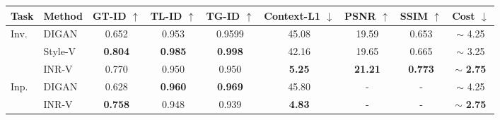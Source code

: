 \documentclass[10pt]{article} \usepackage[accepted]{tmlr}
\begin{document}
\begin{wraptable}[21]{R}{12cm}

\centering
\vspace{5pt}

\begin{adjustbox}{max width=\linewidth}
\begin{tabular}{l | l | cccccc| c}
\toprule  
Task & Method & GT-ID $\uparrow$ & TL-ID $\uparrow$ & TG-ID $\uparrow$ & Context-L1 $\downarrow$ & PSNR $\uparrow$ & SSIM $\uparrow$ & Cost $\downarrow$ \\ \midrule
\multirow{3}{*}{Inv.} & DIGAN & 0.652 & 0.953 & 0.9599 & 45.08 & 19.59 & 0.653 & $\sim$ 4.25\\
 & Style-V & \textbf{0.804} &\textbf{ 0.985} & \textbf{0.998} & 42.16 & 19.65 & 0.665 & $\sim$ 3.25 \\
 & INR-V & 0.770 & 0.950 & 0.950 & \textbf{5.25} & \textbf{21.21} & \textbf{0.773} & $\sim$ \textbf{2.75}\\
 \midrule
 
\multirow{2}{*}{Inp.} & DIGAN & 0.628 & \textbf{0.960} & \textbf{0.969} & 45.80 & - & - & $\sim$ 4.25 \\
 & INR-V & \textbf{0.758} & 0.948 & 0.939 & \textbf{4.83} & - & - & $\sim$ \textbf{2.75}\\
 \midrule
 

\end{tabular}
\end{adjustbox}
\end{wraptable}
\end{document}
